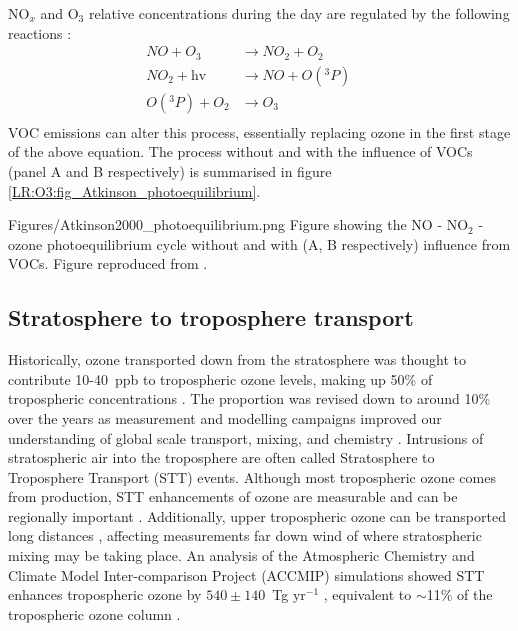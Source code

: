     NO$_x$ and O$_3$ relative concentrations during the day are regulated by the following reactions \parencite{Sillman1999,Atkinson2000}:
    \begin{equation}
      \begin{aligned}
        NO + O_3         & \to NO_2 + O_2      && \\%
        NO_2 + \text{hv} & \to NO + O({}^3P)   && \\%
        O({}^3P) + O_2   & \to O_3 			 && \\%
      \end{aligned}
      \label{LR:Atmos:Chem:eqn_NOandO3}
    \end{equation}
    VOC emissions can alter this process, essentially replacing ozone in the first stage of the above equation.
    The process without and with the influence of VOCs (panel A and B respectively) is summarised in figure \ref{LR:O3:fig_Atkinson_photoequilibrium}.
    
      {Figures/Atkinson2000_photoequilibrium.png}
      {Figure showing the NO - NO$_2$ - ozone photoequilibrium cycle without and with (A, B respectively) influence from VOCs. Figure reproduced from \textcite{Atkinson2000}.}
      {\label{LR:O3:fig_Atkinson_photoequilibrium}}
    
    
    
  
  \subsection{Stratosphere to troposphere transport}
    \label{LR:O3:STT}
    Historically, ozone transported down from the stratosphere was thought to contribute 10-40~ppb to tropospheric ozone levels, making up 50\% of tropospheric concentrations \parencite{Atkinson2000, Stohl2003}.
    The proportion was revised down to around 10\% over the years as measurement and modelling campaigns improved our understanding of global scale transport, mixing, and chemistry \parencite{Guenther2006,Monks2015}.
    Intrusions of stratospheric air into the troposphere are often called Stratosphere to Troposphere Transport (STT) events.
    Although most tropospheric ozone comes from production, STT enhancements of ozone are measurable and can be regionally important \parencite[eg.][]{Jacobson2000,Lelieveld2009,Kuang2017}.
    Additionally, upper tropospheric ozone can be transported long distances \parencite{Cooper2004}, affecting measurements far down wind of where stratospheric mixing may be taking place.
    An analysis of the Atmospheric Chemistry and Climate Model Inter-comparison Project (ACCMIP) simulations showed STT enhances tropospheric ozone by $540\pm140$~Tg yr$^{-1}$ \parencite{Young2013}, equivalent to $\sim$11\% of the tropospheric ozone column \parencite{Monks2015}.
    
